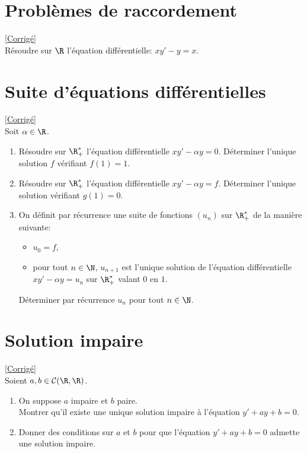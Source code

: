 \documentclass{book}
\begin{document}
\section{Problèmes de raccordement}
\textcolor{blue}{\hyperref[sec:problemes-de-raccordement]{[Corrigé]}}\\
\label{Problème de raccordement}
Résoudre sur $\R$ l'équation différentielle: $xy'-y=x$.

\section{Suite d'équations différentielles}
\textcolor{blue}{\hyperref[sec:suite-dequations-differentielles]{[Corrigé]}}\\
\label{Suite d'équations différentielles}
Soit $\alpha\in\R$.
\begin{enumerate}
	\item Résoudre sur $\R_+^*$ l'équation différentielle $xy'-\alpha y =0$. Déterminer l'unique solution $f$ vérifiant $f(1)=1$.
	\item Résoudre sur $\R_+^*$ l'équation différentielle $xy'-\alpha y =f$. Déterminer l'unique solution vérifiant $g(1)=0$.
	\item On définit par récurrence une suite de fonctions $(u_n)$ sur $\R_+^*$ de la manière suivante:
	\begin{itemize}
		\item $u_0=f$,
		\item pour tout $n\in\N$, $u_{n+1}$ est l'unique solution de l'équation différentielle $xy'-\alpha y=u_n$ sur $\R^*_+$ valant $0$ en $1$.
	\end{itemize}
	Déterminer par récurrence $u_n$ pour tout $n\in\N$.
\end{enumerate}

\section{Solution impaire }
\textcolor{blue}{\hyperref[Solution impaire corrigé]{[Corrigé]}}\\
\label{Solution impaire}
Soient $a,b\in \mathcal C(\R,\R)$.
\begin{enumerate}
	\item On suppose $a$ impaire et $b$ paire.\\
	Montrer qu'il existe une unique solution impaire à l'équation $y'+ay+b=0$.
	\item Donner des conditions sur $a$ et $b$ pour que l'équation $y'+ay+b=0$ admette une solution impaire.
\end{enumerate}
\end{document}
